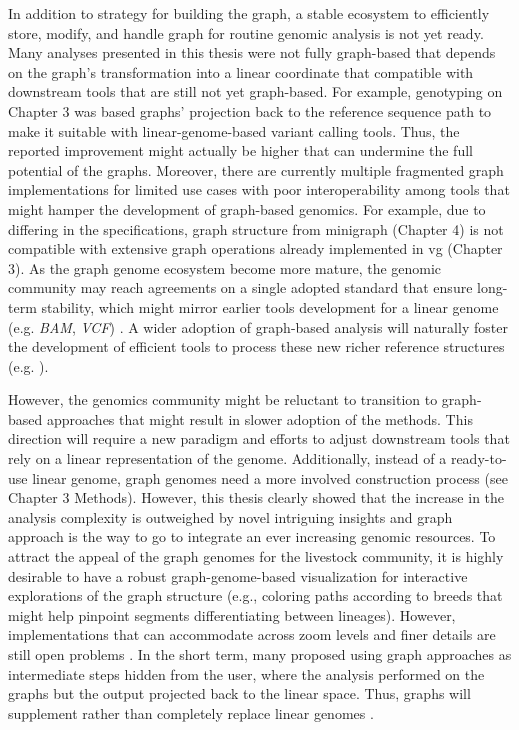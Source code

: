 \documentclass[../main.tex]{subfiles}
\begin{document}
In addition to strategy for building the graph, a stable ecosystem to efficiently store, modify, and handle graph for routine genomic analysis is not yet ready. Many analyses presented in this thesis were not fully graph-based that depends on the graph’s transformation into a linear coordinate that compatible with downstream tools that are still not yet graph-based. For example, genotyping on Chapter 3 was based graphs’ projection back to the reference sequence path to make it suitable with linear-genome-based variant calling tools. Thus, the reported improvement might actually be higher that can undermine the full potential of the graphs. Moreover, there are currently multiple fragmented graph implementations for limited use cases with poor interoperability among tools that might hamper the development of graph-based genomics. For example, due to differing in the specifications, graph structure from minigraph (Chapter 4) is not compatible with extensive graph operations already implemented in vg (Chapter 3). As the graph genome ecosystem become more mature, the genomic community may reach agreements on a single adopted standard that ensure long-term stability, which might mirror earlier tools development for a linear genome (e.g. \emph{BAM}, \emph{VCF}) \citep{bonfield2021htslib}. A wider adoption of graph-based analysis will naturally foster the development of efficient tools to process these new richer reference structures (e.g. \citep{qiu2021constructing,schulz2020detecting}). 


However, the genomics community might be reluctant to transition to graph-based approaches that might result in slower adoption of the methods. This direction will require a new paradigm and efforts  to adjust downstream tools that rely on a linear representation of the genome. Additionally, instead of a ready-to-use linear genome, graph genomes need a more involved construction process (see Chapter 3 Methods). However, this thesis clearly showed that the increase in the analysis complexity is outweighed by novel intriguing insights and graph approach is the way to go to integrate an ever increasing genomic resources. To attract the appeal of the graph genomes for the livestock community, it is highly desirable to have a robust graph-genome-based visualization for interactive explorations of the graph structure (e.g., coloring paths according to breeds that might help pinpoint segments differentiating between lineages). However, implementations that can accommodate across zoom levels and finer details are still open problems \citep{yokoyama2019momi,beyer2019sequence,eizenga2020pangenome}. In the short term, many proposed using graph approaches as intermediate steps hidden from the user, where the analysis performed on the graphs but the output projected back to the linear space. Thus, graphs will supplement rather than completely replace linear genomes \citep{kim2019graph,grytten2020assessing,li2020design,siren2020genotyping}. 
\end{document}
